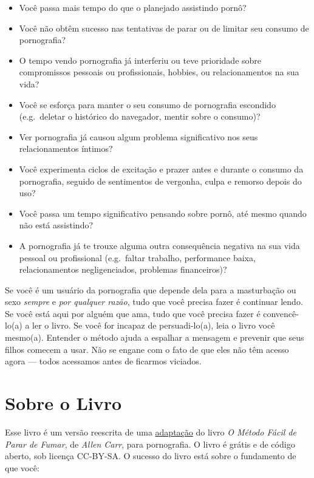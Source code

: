 \documentclass[
  spanish,
  openany]{book}
\let\oldhref\href
\renewcommand{\href}[2]{\textcolor{linkcolor}{\oldhref{#1}{#2}}}
\begin{document}
\begin{itemize}
\item
  Você passa mais tempo do que o planejado assistindo pornô?
\item
  Você não obtêm sucesso nas tentativas de parar ou de limitar seu consumo de pornografia?
\item
  O tempo vendo pornografia já interferiu ou teve prioridade sobre compromissos pessoais ou profissionais, hobbies, ou relacionamentos na sua vida?
\item
  Você se esforça para manter o seu consumo de pornografia escondido (e.g.~deletar o histórico do navegador, mentir sobre o consumo)?
\item
  Ver pornografia já causou algum problema significativo nos seus relacionamentos íntimos?
\item
  Você experimenta ciclos de excitação e prazer antes e durante o consumo da pornografia, seguido de sentimentos de vergonha, culpa e remorso depois do uso?
\item
  Você passa um tempo significativo pensando sobre pornô, até mesmo quando não está assistindo?
\item
  A pornografia já te trouxe alguma outra consequência negativa na sua vida pessoal ou profissional (e.g.~faltar trabalho, performance baixa, relacionamentos negligenciados, problemas financeiros)?
\end{itemize}

Se você é um usuário da pornografia que depende dela para a masturbação ou sexo \emph{sempre} e \emph{por qualquer razão}, tudo que você precisa fazer é continuar lendo. Se você está aqui por alguém que ama, tudo que você precisa fazer é convencê-lo(a) a ler o livro. Se você for incapaz de persuadi-lo(a), leia o livro você mesmo(a). Entender o método ajuda a espalhar a mensagem e prevenir que seus filhos comecem a usar. Não se engane com o fato de que eles não têm acesso agora --- todos acessamos antes de ficarmos viciados.

\hypertarget{sobre-o-livro}{%
\section*{Sobre o Livro}\label{sobre-o-livro}}

Esse livro é um versão reescrita de uma \href{https://web.archive.org/web/20201014165025/https://sites.google.com/site/hackbookeasypeasy/}{adaptação} do livro \emph{O Método Fácil de Parar de Fumar}, de \emph{Allen Carr}, para pornografia. O livro é grátis e de código aberto, sob licença CC-BY-SA. O sucesso do livro está sobre o fundamento de que você:
\end{document}
